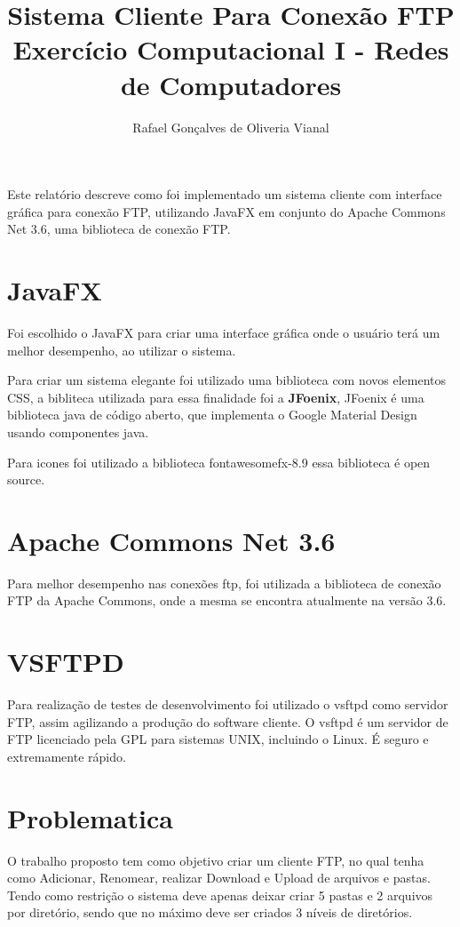\documentclass[12pt]{article}
\title{Sistema Cliente Para Conexão FTP  \\ Exercício Computacional I - Redes de Computadores}
\author{Rafael Gonçalves de Oliveria Vianal\inst{1} }
\begin{document}
 

\maketitle

     
\begin{resumo} 	
  Este relatório descreve como foi implementado um sistema cliente com interface gráfica para conexão FTP, utilizando JavaFX em conjunto do Apache Commons Net 3.6, uma biblioteca de conexão FTP.
\end{resumo}


\section{JavaFX}
Foi escolhido o JavaFX para criar uma interface gráfica onde o usuário terá um melhor desempenho, ao utilizar o sistema.\cite{topley2010javafx}

Para criar um sistema elegante foi utilizado uma biblioteca com novos elementos CSS, a bibliteca utilizada para essa finalidade foi  a \textbf{JFoenix}, JFoenix é uma biblioteca java de código aberto, que implementa o Google Material Design usando componentes java.\cite{JFoenix}

Para icones foi utilizado a biblioteca fontawesomefx-8.9 essa biblioteca é open source.\cite{FontAwesomeFX}
	
\section{Apache Commons Net 3.6} 

Para melhor desempenho nas conexões ftp, foi utilizada a biblioteca de conexão FTP da Apache Commons, onde a mesma se encontra atualmente na versão 3.6.\cite{Apache}

\section{VSFTPD}
Para realização de testes de desenvolvimento foi utilizado o vsftpd como servidor FTP, assim agilizando a produção do software cliente.
O vsftpd é um servidor de FTP licenciado pela GPL para sistemas UNIX, incluindo o Linux. É seguro e extremamente rápido.\cite{bauer2004paranoid}

\section{Problematica}
O trabalho proposto tem como objetivo criar um cliente FTP, no qual tenha como Adicionar, Renomear, realizar Download e Upload de arquivos e pastas. Tendo como restrição o sistema deve apenas deixar criar 5 pastas e 2 arquivos por diretório, sendo que no máximo deve ser criados 3 níveis de diretórios.
 
\end{document}
